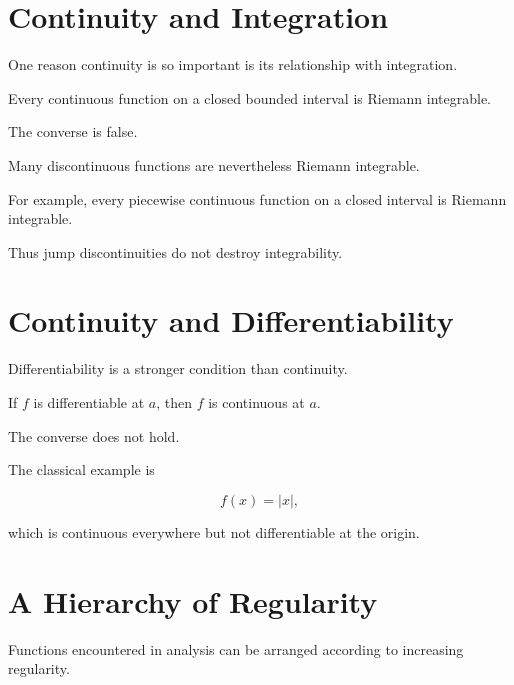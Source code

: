 \documentclass{essay}
\begin{document}
\section{Continuity and Integration}

One reason continuity is so important is its relationship with integration.

\begin{theorem}

  Every continuous function on a closed bounded interval is Riemann integrable.

\end{theorem}

The converse is false.

Many discontinuous functions are nevertheless Riemann integrable.

For example, every piecewise continuous function on a closed interval is
Riemann integrable.

Thus jump discontinuities do not destroy integrability.


\section{Continuity and Differentiability}

Differentiability is a stronger condition than continuity.

\begin{theorem}

  If \(f\) is differentiable at \(a\), then \(f\) is continuous at \(a\).

\end{theorem}

The converse does not hold.

The classical example is

\[ f(x)=|x|, \]

which is continuous everywhere but not differentiable at the origin.


\section{A Hierarchy of Regularity}

Functions encountered in analysis can be arranged according to increasing
regularity.
\end{document}
